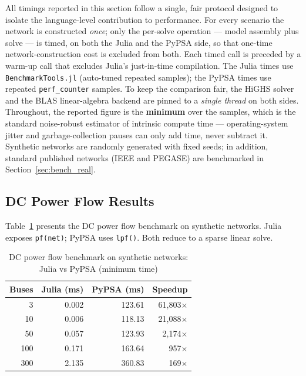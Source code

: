 All timings reported in this section follow a single, fair protocol designed to isolate the language-level contribution to performance. For every scenario the network is constructed \emph{once}; only the per-solve operation --- model assembly plus solve --- is timed, on both the Julia and the PyPSA side, so that one-time network-construction cost is excluded from both. Each timed call is preceded by a warm-up call that excludes Julia's just-in-time compilation. The Julia times use \texttt{BenchmarkTools.jl} (auto-tuned repeated samples); the PyPSA times use repeated \texttt{perf\_counter} samples. To keep the comparison fair, the HiGHS solver and the BLAS linear-algebra backend are pinned to a \emph{single thread} on both sides. Throughout, the reported figure is the \textbf{minimum} over the samples, which is the standard noise-robust estimator of intrinsic compute time --- operating-system jitter and garbage-collection pauses can only add time, never subtract it. Synthetic networks are randomly generated with fixed seeds; in addition, standard published networks (IEEE and PEGASE) are benchmarked in Section~\ref{sec:bench_real}.

\subsection{DC Power Flow Results}

Table~\ref{tab:dc_benchmark} presents the DC power flow benchmark on synthetic networks. Julia exposes \texttt{pf(net)}; PyPSA uses \texttt{lpf()}. Both reduce to a sparse linear solve.

\begin{table}[H]
\centering
\caption{DC power flow benchmark on synthetic networks: Julia vs PyPSA (minimum time)}
\label{tab:dc_benchmark}
\begin{tabular}{rrrr}
\toprule
\textbf{Buses} & \textbf{Julia (ms)} & \textbf{PyPSA (ms)} & \textbf{Speedup} \\
\midrule
    3 &  0.002 & 123.61 & 61{,}803$\times$ \\
   10 &  0.006 & 118.13 & 21{,}088$\times$ \\
   50 &  0.057 & 123.93 &  2{,}174$\times$ \\
  100 &  0.171 & 163.64 &     957$\times$ \\
  300 &  2.135 & 360.83 &     169$\times$ \\
\bottomrule
\end{tabular}
\end{table}

